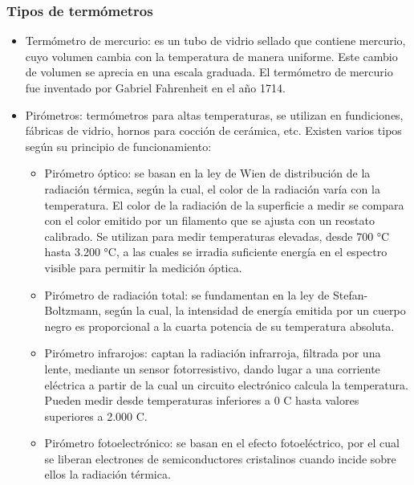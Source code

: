 		\newpage
		\thispagestyle{plain}
	
	\subsubsection{Tipos de termómetros}
	
		\begin{itemize}
			\item Termómetro de mercurio: es un tubo de vidrio sellado que contiene mercurio, cuyo volumen cambia con la temperatura de manera uniforme. Este cambio de volumen se aprecia en una escala graduada. El termómetro de mercurio fue inventado por Gabriel Fahrenheit en el año 1714.
			
			\item Pirómetros:  termómetros para altas temperaturas, se utilizan en fundiciones, fábricas de vidrio, hornos para cocción de cerámica, etc. Existen varios tipos según su principio de funcionamiento:
			
			\begin{itemize}
				\item Pirómetro óptico: se basan en la ley de Wien de distribución de la radiación térmica, según la cual, el color de la radiación varía con la temperatura. El color de la radiación de la superficie a medir se compara con el color emitido por un filamento que se ajusta con un reostato calibrado. Se utilizan para medir temperaturas elevadas, desde 700 °C hasta 3.200 °C, a las cuales se irradia suficiente energía en el espectro visible para permitir la medición óptica.
				
				\item Pirómetro de radiación total: se fundamentan en la ley de Stefan-Boltzmann, según la cual, la intensidad de energía emitida por un cuerpo negro es proporcional a la cuarta potencia de su temperatura absoluta.
				
				\item Pirómetro infrarojos: captan la radiación infrarroja, filtrada por una lente, mediante un sensor fotorresistivo, dando lugar a una corriente eléctrica a partir de la cual un circuito electrónico calcula la temperatura. Pueden medir desde temperaturas inferiores a 0 \textdegree{}C hasta valores superiores a 2.000 \textdegree{}C.
				
				\item Pirómetro fotoelectrónico: se basan en el efecto fotoeléctrico, por el cual se liberan electrones de semiconductores cristalinos cuando incide sobre ellos la radiación térmica.
			\end{itemize}
			

\end{itemize}
